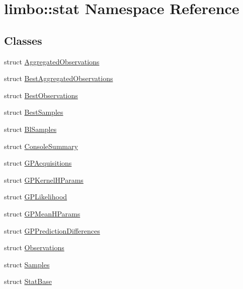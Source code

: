 \hypertarget{namespacelimbo_1_1stat}{}\section{limbo\+:\+:stat Namespace Reference}
\label{namespacelimbo_1_1stat}
\subsection*{Classes}
\begin{DoxyCompactItemize}
\item 
struct \hyperlink{structlimbo_1_1stat_1_1_aggregated_observations}{Aggregated\+Observations}
\item 
struct \hyperlink{structlimbo_1_1stat_1_1_best_aggregated_observations}{Best\+Aggregated\+Observations}
\item 
struct \hyperlink{structlimbo_1_1stat_1_1_best_observations}{Best\+Observations}
\item 
struct \hyperlink{structlimbo_1_1stat_1_1_best_samples}{Best\+Samples}
\item 
struct \hyperlink{structlimbo_1_1stat_1_1_bl_samples}{Bl\+Samples}
\item 
struct \hyperlink{structlimbo_1_1stat_1_1_console_summary}{Console\+Summary}
\item 
struct \hyperlink{structlimbo_1_1stat_1_1_g_p_acquisitions}{G\+P\+Acquisitions}
\item 
struct \hyperlink{structlimbo_1_1stat_1_1_g_p_kernel_h_params}{G\+P\+Kernel\+H\+Params}
\item 
struct \hyperlink{structlimbo_1_1stat_1_1_g_p_likelihood}{G\+P\+Likelihood}
\item 
struct \hyperlink{structlimbo_1_1stat_1_1_g_p_mean_h_params}{G\+P\+Mean\+H\+Params}
\item 
struct \hyperlink{structlimbo_1_1stat_1_1_g_p_prediction_differences}{G\+P\+Prediction\+Differences}
\item 
struct \hyperlink{structlimbo_1_1stat_1_1_observations}{Observations}
\item 
struct \hyperlink{structlimbo_1_1stat_1_1_samples}{Samples}
\item 
struct \hyperlink{structlimbo_1_1stat_1_1_stat_base}{Stat\+Base}
\end{DoxyCompactItemize}
